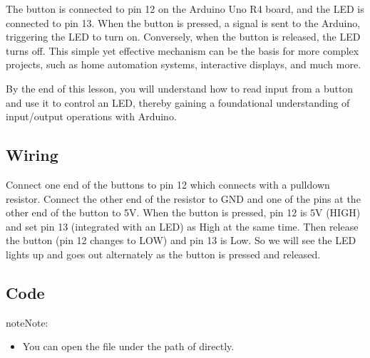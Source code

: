 \documentclass[a4paper,11pt,english]{sphinxmanual}
\begin{document}
\sphinxAtStartPar
The button is connected to pin 12 on the Arduino Uno R4 board, and the LED is connected to pin 13. When the button is pressed, a signal is sent to the Arduino, triggering the LED to turn on. Conversely, when the button is released, the LED turns off. This simple yet effective mechanism can be the basis for more complex projects, such as home automation systems, interactive displays, and much more.

\sphinxAtStartPar
By the end of this lesson, you will understand how to read input from a button and use it to control an LED, thereby gaining a foundational understanding of input/output operations with Arduino.


\subsection{Wiring}
\label{\detokenize{Basic_Project/Button_LED:wiring}}

\sphinxAtStartPar
Connect one end of the buttons to pin 12 which connects with a pull\sphinxhyphen{}down resistor. Connect the other end of the resistor to GND and one of the pins at the other end of the button to 5V. When the button is pressed, pin 12 is 5V (HIGH) and set pin 13 (integrated with an LED) as High at the same time. Then release the button (pin 12 changes to LOW) and pin 13 is Low. So we will see the LED lights up and goes out alternately as the button is pressed and released.


\subsection{Code}
\label{\detokenize{Basic_Project/Button_LED:code}}
\begin{sphinxadmonition}{note}{Note:}\begin{itemize}
\item {} 
\sphinxAtStartPar
You can open the file  under the path of  directly.

\end{itemize}
\end{sphinxadmonition}
\end{document}
